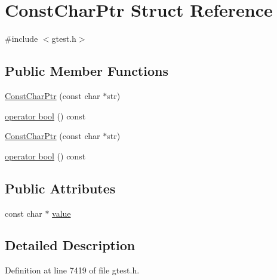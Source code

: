 \hypertarget{structtesting_1_1internal_1_1ConstCharPtr}{\section{\-Const\-Char\-Ptr \-Struct \-Reference}
\label{de/d08/structtesting_1_1internal_1_1ConstCharPtr}
}


{\ttfamily \#include $<$gtest.\-h$>$}

\subsection*{\-Public \-Member \-Functions}
\begin{DoxyCompactItemize}
\item 
\hyperlink{structtesting_1_1internal_1_1ConstCharPtr_a57848b2c718f16a659ff8e241541dc5c}{\-Const\-Char\-Ptr} (const char $\ast$str)
\item 
\hyperlink{structtesting_1_1internal_1_1ConstCharPtr_aa385aa18f5e42db5a415c25a90f4193d}{operator bool} () const 
\item 
\hyperlink{structtesting_1_1internal_1_1ConstCharPtr_a57848b2c718f16a659ff8e241541dc5c}{\-Const\-Char\-Ptr} (const char $\ast$str)
\item 
\hyperlink{structtesting_1_1internal_1_1ConstCharPtr_aa385aa18f5e42db5a415c25a90f4193d}{operator bool} () const 
\end{DoxyCompactItemize}
\subsection*{\-Public \-Attributes}
\begin{DoxyCompactItemize}
\item 
const char $\ast$ \hyperlink{structtesting_1_1internal_1_1ConstCharPtr_a92d544bd66c050551f3d87fa55eb3f5d}{value}
\end{DoxyCompactItemize}


\subsection{\-Detailed \-Description}


\-Definition at line 7419 of file gtest.\-h.



